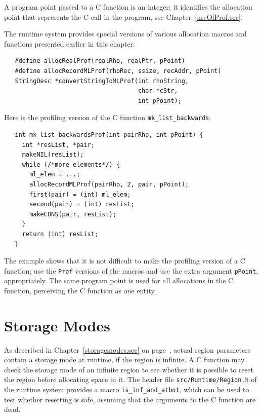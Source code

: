 \documentclass[12pt]{book}
\begin{document}
A program point passed to a C function is an integer; it identifies the
allocation point that represents the C call in the program, see
Chapter~\ref{useOfProf.sec}.

The runtime system provides special versions of various allocation
macros and functions presented earlier in this chapter:
%
%
%
\begin{verbatim}
   #define allocRealProf(realRho, realPtr, pPoint)
   #define allocRecordMLProf(rhoRec, ssize, recAddr, pPoint)
   StringDesc *convertStringToMLProf(int rhoString, 
                                     char *cStr, 
                                     int pPoint);
\end{verbatim}

Here is the profiling version of the C function
\verb|mk_list_backwards|:
\begin{verbatim}
   int mk_list_backwardsProf(int pairRho, int pPoint) {
     int *resList, *pair;
     makeNIL(resList);  
     while (/*more elements*/) {
       ml_elem = ...;
       allocRecordMLProf(pairRho, 2, pair, pPoint);
       first(pair) = (int) ml_elem;
       second(pair) = (int) resList;
       makeCONS(pair, resList);
     }
     return (int) resList;
   }
\end{verbatim}
The example shows that it is not difficult to make the profiling
version of a C function; use the \texttt{Prof} versions of the
macros and use the extra argument \texttt{pPoint}, appropriately. The
same program point is used for all allocations in the C function,
perceiving the C function as one entity.

\section{Storage Modes}
As described in Chapter~\ref{storagemodes.sec} on
page~\pageref{atbit.lab}, actual region parameters contain a storage
mode at runtime, if the region is infinite.  A C function may check
the storage mode of an infinite region to see whether it is possible
to reset the region before allocating space in it. The header file
{\tt src/Runtime/Region.h} of the runtime system provides a macro
%
\verb|is_inf_and_atbot|, which can be used to test whether resetting
is safe, assuming that the arguments to the C function are dead.
\end{document}
